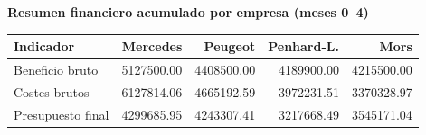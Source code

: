 \documentclass{standalone}
\begin{document}
	\leavevmode %
	
	\begin{minipage}{0.96\linewidth}
		\centering
		
		\textbf{Resumen financiero acumulado por empresa (meses 0--4)}
		\begin{tabular}{@{}lrrrr@{}}
			\toprule
			\textbf{Indicador}
			& \textbf{Mercedes}
			& \textbf{Peugeot}
			& \textbf{Penhard-L.}
			& \textbf{Mors} \\
			\midrule
			Beneficio bruto & 5127500.00 & 4408500.00 & 4189900.00 &  4215500.00 \\
			Costes brutos & 6127814.06  & 4665192.59 & 3972231.51 & 3370328.97 \\
			Presupuesto final & 4299685.95  & 4243307.41 & 3217668.49 & 3545171.04 \\
			\bottomrule
		\end{tabular}
	\end{minipage}
	
	
\end{document}
